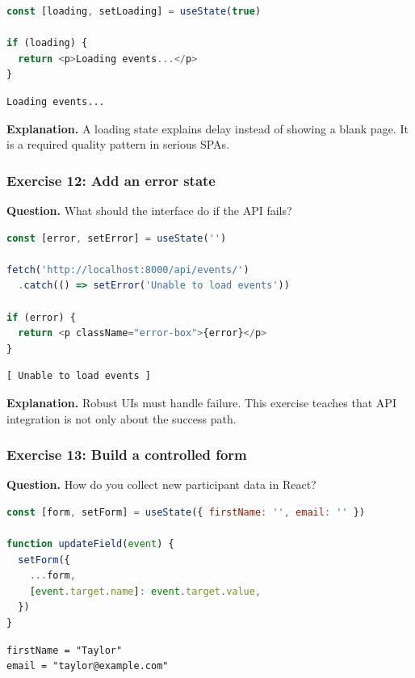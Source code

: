 \documentclass[11pt,a4paper]{article}
\begin{document}
\begin{lstlisting}[style=code, language=JavaScript]
const [loading, setLoading] = useState(true)

if (loading) {
  return <p>Loading events...</p>
}
\end{lstlisting}

\begin{lstlisting}[style=terminal]
Loading events...
\end{lstlisting}

\textbf{Explanation.} A loading state explains delay instead of showing a blank page. It is a required quality pattern in serious SPAs.

\subsubsection*{Exercise 12: Add an error state}
\textbf{Question.} What should the interface do if the API fails?

\begin{lstlisting}[style=code, language=JavaScript]
const [error, setError] = useState('')

fetch('http://localhost:8000/api/events/')
  .catch(() => setError('Unable to load events'))

if (error) {
  return <p className="error-box">{error}</p>
}
\end{lstlisting}

\begin{lstlisting}[style=terminal]
[ Unable to load events ]
\end{lstlisting}

\textbf{Explanation.} Robust UIs must handle failure. This exercise teaches that API integration is not only about the success path.

\subsubsection*{Exercise 13: Build a controlled form}
\textbf{Question.} How do you collect new participant data in React?

\begin{lstlisting}[style=code, language=JavaScript]
const [form, setForm] = useState({ firstName: '', email: '' })

function updateField(event) {
  setForm({
    ...form,
    [event.target.name]: event.target.value,
  })
}
\end{lstlisting}

\begin{lstlisting}[style=terminal]
firstName = "Taylor"
email = "taylor@example.com"
\end{lstlisting}
\end{document}
